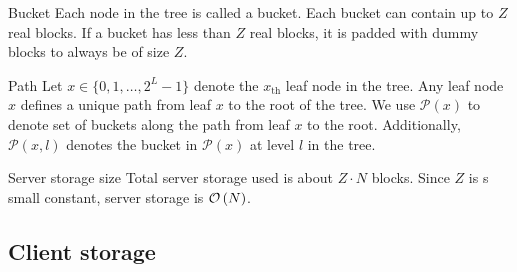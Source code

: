 		\begin{frame}{\subsecname}
			
			\begin{block}{Bucket}
				Each node in the tree is called a bucket. 
				Each bucket can contain up to $Z$ real blocks. 
				If a bucket has less than $Z$ real blocks, it is padded with dummy blocks to always be of size $Z$.
			\end{block}

		\end{frame}

		\begin{frame}{\subsecname}
			
			\begin{block}{Path}
				Let $x \in \{ 0, 1, \ldots, 2^L - 1 \}$ denote the $x_{\text{th}}$ leaf node in the tree. 
				Any leaf node $x$ defines a unique path from leaf $x$ to the root of the tree.
				We use $\mathcal{P}(x)$ to denote set of buckets along the path from leaf $x$ to the root. 
				Additionally, $\mathcal{P}(x,l)$ denotes the bucket in $\mathcal{P}(x)$ at level $l$ in the tree.
			\end{block}

		\end{frame}

		\begin{frame}{\subsecname}
			
			\begin{block}{Server storage size}
				Total server storage used is about $Z \cdot N$ blocks.
				Since $Z$ is s small constant, server storage is $\mathcal{O}\left(N\right)$.
			\end{block} 

		\end{frame}

	\subsection{Client storage}

